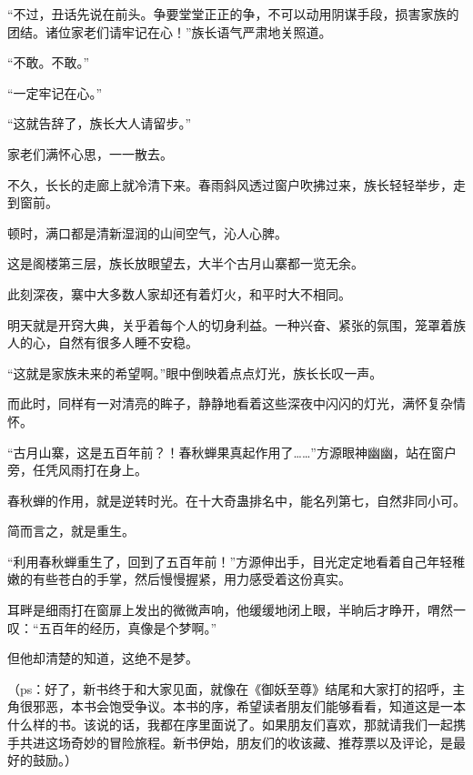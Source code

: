 \begin{this_body}
“不过，丑话先说在前头。争要堂堂正正的争，不可以动用阴谋手段，损害家族的团结。诸位家老们请牢记在心！”族长语气严肃地关照道。

“不敢。不敢。”

“一定牢记在心。”

“这就告辞了，族长大人请留步。”

家老们满怀心思，一一散去。

不久，长长的走廊上就冷清下来。春雨斜风透过窗户吹拂过来，族长轻轻举步，走到窗前。

顿时，满口都是清新湿润的山间空气，沁人心脾。

这是阁楼第三层，族长放眼望去，大半个古月山寨都一览无余。

此刻深夜，寨中大多数人家却还有着灯火，和平时大不相同。

明天就是开窍大典，关乎着每个人的切身利益。一种兴奋、紧张的氛围，笼罩着族人的心，自然有很多人睡不安稳。

“这就是家族未来的希望啊。”眼中倒映着点点灯光，族长长叹一声。

而此时，同样有一对清亮的眸子，静静地看着这些深夜中闪闪的灯光，满怀复杂情怀。

“古月山寨，这是五百年前？！春秋蝉果真起作用了……”方源眼神幽幽，站在窗户旁，任凭风雨打在身上。

春秋蝉的作用，就是逆转时光。在十大奇蛊排名中，能名列第七，自然非同小可。

简而言之，就是重生。

“利用春秋蝉重生了，回到了五百年前！”方源伸出手，目光定定地看着自己年轻稚嫩的有些苍白的手掌，然后慢慢握紧，用力感受着这份真实。

耳畔是细雨打在窗扉上发出的微微声响，他缓缓地闭上眼，半晌后才睁开，喟然一叹：“五百年的经历，真像是个梦啊。”

但他却清楚的知道，这绝不是梦。

（ps：好了，新书终于和大家见面，就像在《御妖至尊》结尾和大家打的招呼，主角很邪恶，本书会饱受争议。本书的序，希望读者朋友们能够看看，知道这是一本什么样的书。该说的话，我都在序里面说了。如果朋友们喜欢，那就请我们一起携手共进这场奇妙的冒险旅程。新书伊始，朋友们的收该藏、推荐票以及评论，是最好的鼓励。）

\end{this_body}

